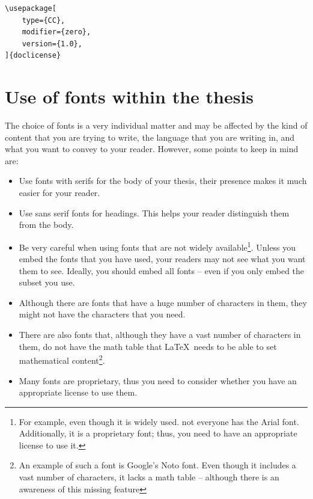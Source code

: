 \documentclass[examplethesis.tex]{subfiles}
\begin{document}
\begin{lstlisting}[style=latexExampleForAuthors]
\usepackage[
    type={CC},
    modifier={zero},
    version={1.0},
]{doclicense}
\end{lstlisting}

\section{Use of fonts within the thesis}
\label{sec:useOfFontsWithinThesis}

The choice of fonts is a very individual matter and may be affected by the kind of content that you are trying to write, the language that you are writing in, and what you want to convey to your reader. However, some points to keep in mind are:
\begin{itemize}
    \item Use fonts with serifs for the body of your thesis, their presence makes it much easier for your reader.

    \item Use sans serif fonts for headings. This helps your reader distinguish them from the body.

    \item Be very careful when using fonts that are not widely available\footnote{For example, even though it is widely used. not everyone has the Arial font. Additionally, it is a proprietary font; thus, you need to have an appropriate license to use it.}. Unless you embed the fonts that you have used, your readers may not see what you want them to see. Ideally, you should embed all fonts -- even if you only embed the subset you use.

    \item Although there are fonts that have a huge number of characters in them, they might not have the characters that you need.

    \item There are also fonts that, although they have a vast number of characters in them, do not have the math table that \LaTeX\ needs to be able to set mathematical content\footnote{An example of such a font is Google's Noto font. Even though it includes a vast number of characters, it lacks a math table -- although there is an awareness of this missing feature}.

    \item Many fonts are proprietary, thus you need to consider whether you have an appropriate license to use them.
\end{itemize}
\end{document}
